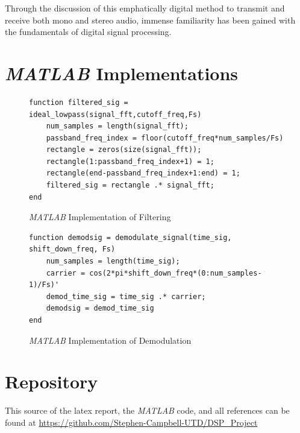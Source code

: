 \documentclass[journal]{IEEEtran}
\begin{document}
Through the discussion of this emphatically digital method to transmit and
receive both mono and stereo audio, immense familiarity has been gained with the
fundamentals of  digital signal processing.

\appendices
\section{\emph{MATLAB} Implementations}

\begin{figure}[h]
    \caption{\label{fig:filter_m} \emph{MATLAB} Implementation of Filtering}
    \begin{lstlisting}
function filtered_sig = ideal_lowpass(signal_fft,cutoff_freq,Fs)
    num_samples = length(signal_fft);
    passband_freq_index = floor(cutoff_freq*num_samples/Fs)
    rectangle = zeros(size(signal_fft));
    rectangle(1:passband_freq_index+1) = 1;
    rectangle(end-passband_freq_index+1:end) = 1;
    filtered_sig = rectangle .* signal_fft;
end
\end{lstlisting}
\end{figure}

\begin{figure}[h]
    \caption{\label{fig:demod_m} \emph{MATLAB} Implementation of Demodulation}
    \begin{center}
        \begin{lstlisting}
function demodsig = demodulate_signal(time_sig, shift_down_freq, Fs) 
    num_samples = length(time_sig);
    carrier = cos(2*pi*shift_down_freq*(0:num_samples-1)/Fs)'
    demod_time_sig = time_sig .* carrier;
    demodsig = demod_time_sig
end
\end{lstlisting}


    \end{center}
\end{figure}

\section{Repository}
This source of the latex report, the \emph{MATLAB} code, and all references can
be found at \url{https://github.com/Stephen-Campbell-UTD/DSP_Project}
\end{document}
